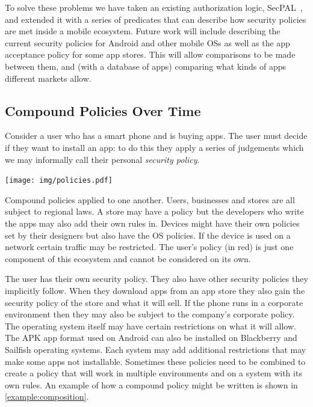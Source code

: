 \documentclass[a4paper,sfsidenotes]{%
  article%
}
\begin{document}
To solve these problems we have taken an existing authorization logic,
SecPAL~\cite{Becker:2006vh}, and extended it with a series of predicates that
can describe how security policies are met inside a mobile ecosystem.  Future
work will include describing the current security policies for Android and other
mobile OSs as well as the app acceptance policy for some app stores.  This will
allow comparisons to be made between them, and (with a database of apps)
comparing what kinds of apps different markets allow.

\subsection{Compound Policies Over Time}\label{sec:polovertime}

Consider a user who has a smart phone and is buying apps.  The user must decide
if they want to install an app: to do this they apply a series of judgements
which we may informally call their personal \emph{security policy}.  

\begin{marginfigure}
  \texttt{[image: img/policies.pdf]}
  \caption{Compound policies applied to one another.  Users, businesses
  and stores are all subject to regional laws.  A store may have a policy but
the developers who write the apps may also add their own rules in.  Devices
might have their own policies set by their designers but also have the OS
policies.  If the device is used on a network certain traffic may be restricted.
The user's policy (in red) is just one component of this ecosystem and cannot be
considered on its own.}
  \label{fig:policies}
\end{marginfigure}

The user has their own security policy. They also have other security policies
they implicitly follow.  When they download apps from an app store they also
gain the security policy of the store and what it will sell.  If the phone runs
in a corporate environment then they may also be subject to the company's
corporate policy.  The operating system itself may have certain restrictions on
what it will allow.  The APK app format used on Android can also be installed on
Blackberry and Sailfish operating systems.  Each system may add additional
restrictions that may make some apps not installable.  Sometimes these policies
need to be combined to create a policy that will work in multiple environments
and on a system with its own rules.  An example of how a compound policy might
be written is shown in \autoref{example:composition}.
\end{document}
